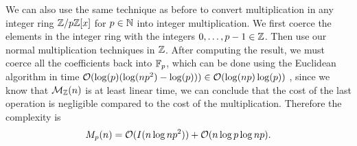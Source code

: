 We can also use the same technique as before to convert multiplication in any integer ring ${\mathbb Z}/p{\mathbb Z}[x]$ for $p \in {\mathbb N}$ into integer multiplication. We first coerce the elements in the integer ring with the integers $0,\ldots, p-1 \in {\mathbb Z}$. Then use our normal multiplication techniques in ${\mathbb Z}$. After computing the result, we must coerce all the coefficients back into ${\mathbb F}_p$, which can be done using the Euclidean algorithm in time $\mathcal O(\log(p)(\log(np^2) - \log (p))) \in \mathcal O(\log (np)\log (p))$ , since we know that $\mathcal M_{\mathbb Z}(n)$ is at least linear time, we can conclude that the cost of the last operation is negligible compared to the cost of the multiplication. Therefore the complexity is
\[
    M_p(n) = \mathcal O(I(n \log np^2)) + \mathcal O(n \log p \log np).
\]

\medskip




